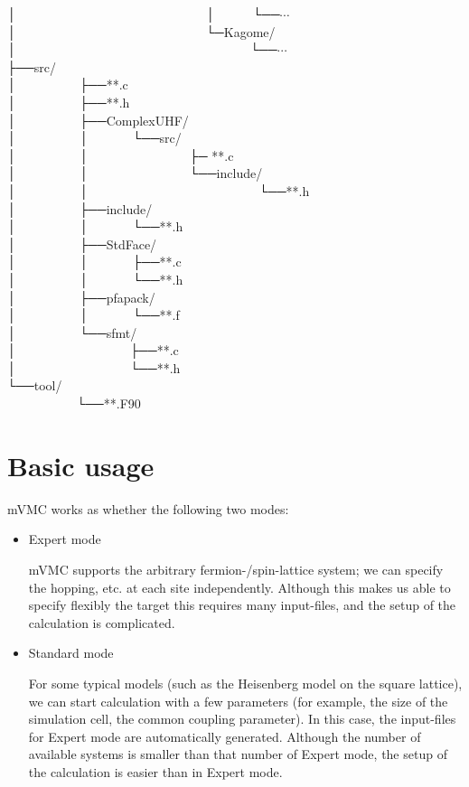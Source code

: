 │~~~~~~~~~~~~~~~~~~~~~~~~~~~~~~│~~~~~~└──$\cdots$\\
│~~~~~~~~~~~~~~~~~~~~~~~~~~~~~~└─Kagome/\\
│~~~~~~~~~~~~~~~~~~~~~~~~~~~~~~~~~~~~~└──$\cdots$\\
├──src/\\
│~~~~~~~~~~├──**.c\\
│~~~~~~~~~~├──**.h\\
│~~~~~~~~~~├──ComplexUHF/\\
│~~~~~~~~~~│~~~~~~~└──src/\\
│~~~~~~~~~~│~~~~~~~~~~~~~~~~├─ **.c\\
│~~~~~~~~~~│~~~~~~~~~~~~~~~~└──include/\\
│~~~~~~~~~~│~~~~~~~~~~~~~~~~~~~~~~~~~~~└──**.h\\
│~~~~~~~~~~├──include/\\
│~~~~~~~~~~│~~~~~~~└──**.h\\
│~~~~~~~~~~├──StdFace/\\
│~~~~~~~~~~│~~~~~~~├──**.c\\
│~~~~~~~~~~│~~~~~~~└──**.h\\
│~~~~~~~~~~├──pfapack/\\
│~~~~~~~~~~│~~~~~~~└──**.f\\
│~~~~~~~~~~└──sfmt/\\
│~~~~~~~~~~~~~~~~~~├──**.c\\
│~~~~~~~~~~~~~~~~~~└──**.h\\
└──tool/\\
~~~~~~~~~~~└──**.F90\\

\newpage
\section{Basic usage}

mVMC works as whether the following two modes:

\begin{itemize}
\item Expert mode

  mVMC supports the arbitrary fermion-/spin-lattice system;
  we can specify the hopping, etc. at each site independently.
  Although this makes us able to specify flexibly the target
  this requires many input-files, and
  the setup of the calculation is complicated.

\item Standard mode

  For some typical models (such as the Heisenberg model on the square lattice),
  we can start calculation with a few parameters (for example, the size of the
  simulation cell, the common coupling parameter).
  In this case, the input-files for Expert mode are automatically generated.
  Although the number of available systems is smaller than that number of Expert mode,
  the setup of the calculation is easier than in Expert mode.

\end{itemize}


